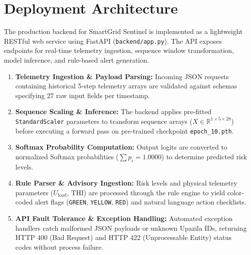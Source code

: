 \section{Deployment Architecture}
The production backend for SmartGrid Sentinel is implemented as a lightweight RESTful web service using FastAPI (\texttt{backend/app.py}). The API exposes endpoints for real-time telemetry ingestion, sequence window transformation, model inference, and rule-based alert generation.

\begin{enumerate}
    \item \textbf{Telemetry Ingestion \& Payload Parsing:} Incoming JSON requests containing historical 5-step telemetry arrays are validated against schemas specifying 27 raw input fields per timestamp.
    \item \textbf{Sequence Scaling \& Inference:} The backend applies pre-fitted \texttt{StandardScaler} parameters to transform sequence arrays ($X \in \mathbb{R}^{1 \times 5 \times 28}$) before executing a forward pass on pre-trained checkpoint \texttt{epoch\_10.pth}.
    \item \textbf{Softmax Probability Computation:} Output logits are converted to normalized Softmax probabilities ($\sum p_i = 1.0000$) to determine predicted risk levels.
    \item \textbf{Rule Parser \& Advisory Ingestion:} Risk levels and physical telemetry parameters ($U_{\text{load}}$, $\text{THI}$) are processed through the rule engine to yield color-coded alert flags (\texttt{GREEN}, \texttt{YELLOW}, \texttt{RED}) and natural language action checklists.
    \item \textbf{API Fault Tolerance \& Exception Handling:} Automated exception handlers catch malformed JSON payloads or unknown Upazila IDs, returning HTTP 400 (Bad Request) and HTTP 422 (Unprocessable Entity) status codes without process failure.
\end{enumerate}
